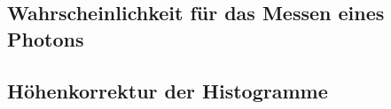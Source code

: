 \subsection{Wahrscheinlichkeit für das Messen eines Photons}
\label{sec:Wahrscheinlichkeitsrechnung}

\subsection{Höhenkorrektur der Histogramme}
\label{sec:TheorieKorrektur}


